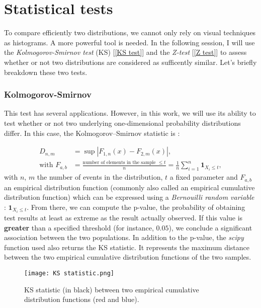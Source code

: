 \section{Statistical tests}

To compare efficiently two distributions, we cannot only rely on visual techniques as histograms. A more powerful tool is needed. In the following session, I will use the \textit{Kolmogorov-Smirnov test} (KS) [\ref{KS test}] and the \textit{Z-test} [\ref{Z test}] to assess whether or not two distributions are considered as sufficently similar. Let's briefly breakdown these two tests.

\subsubsection*{Kolmogorov-Smirnov}

This test has several applications. However, in this work, we will use its ability to test whether or not two underlying one-dimensional probability distributions differ. In this case, the Kolmogorov–Smirnov statistic is :

\begin{equation}
\begin{aligned}
    D_{n,m} &= \sup |F_{1,n}(x) - F_{2,m}(x)|, \\
    \text{with } F_{a,b} &= \frac{\text{number of elements in the sample $\leq t$}}{n} = \frac{1}{n} \sum^n_{i=1} \textbf{1}_{X_i \le t},
\end{aligned}
\end{equation}
with $n$, $m$ the number of events in the distribution, $t$ a fixed parameter and $F_{a,b}$ an empirical distribution function (commonly also called an empirical cumulative distribution function) which can be expressed using a \textit{Bernouilli random variable} : $\textbf{1}_{X_i \le t}$. From there, we can compute the p-value, the probability of obtaining test results at least as extreme as the result actually observed. If this value is \textbf{greater} than a specified threshold (for instance, $0.05$), we conclude a significant association between the two populations.
In addition to the p-value, the \textit{scipy} function used also returns the KS statistic. It represents the maximum distance between the two empirical cumulative distribution functions of the two samples.

\begin{figure}[H]
    \centering
    \texttt{[image: KS statistic.png]}
    \caption{KS statistic (in black) between two empirical cumulative distribution functions (red and blue).}
    \label{fig:enter-label}
\end{figure}

